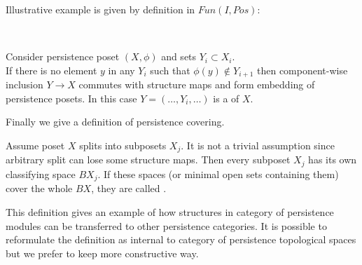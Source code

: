 Illustrative example is given by definition in $Fun(I, Pos)$:\\

\begin{definition} ~ \par
  Consider persistence poset $(X,\phi)$ and sets $Y_i \subset X_i$.\\

  If there is no element $y$ in any $Y_i$ such that $\phi(y) \not\in Y_{i+1}$ then component-wise inclusion $Y \to X$ commutes with structure maps and form embedding of persistence posets. In this case $Y=(\ldots,Y_i,\ldots)$ is a  of $X$.
\end{definition}

Finally we give a definition of persistence covering.\\

\begin{definition}
  Assume poset $X$ splits into subposets $X_j$. It is not a trivial assumption since arbitrary split can lose some structure maps. Then every subposet $X_j$ has its own classifying space $BX_j$. If these spaces (or minimal open sets containing them) cover the whole $BX$, they are called .
\end{definition}

This definition gives an example of how structures in category of persistence modules can be transferred to other persistence categories. It is possible to reformulate the definition as internal to category of persistence topological spaces but we prefer to keep more constructive way.
